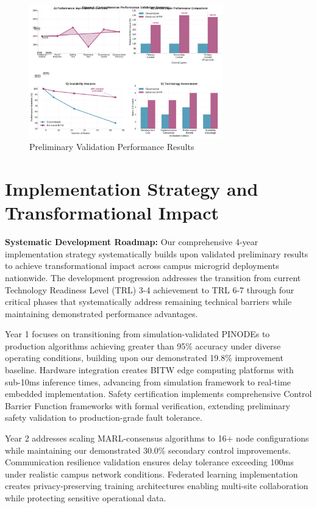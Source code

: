 \documentclass[12pt]{article}
\begin{document}
\begin{figure}[H]
\centering
\includegraphics[width=0.75\textwidth]{figure4_performance_summary.pdf}
\caption{Preliminary Validation Performance Results}
\end{figure}

\section{Implementation Strategy and Transformational Impact}

\textbf{Systematic Development Roadmap:} Our comprehensive 4-year implementation strategy systematically builds upon validated preliminary results to achieve transformational impact across campus microgrid deployments nationwide. The development progression addresses the transition from current Technology Readiness Level (TRL) 3-4 achievement to TRL 6-7 through four critical phases that systematically address remaining technical barriers while maintaining demonstrated performance advantages.

Year 1 focuses on transitioning from simulation-validated PINODEs to production algorithms achieving greater than 95\% accuracy under diverse operating conditions, building upon our demonstrated 19.8\% improvement baseline. Hardware integration creates BITW edge computing platforms with sub-10ms inference times, advancing from simulation framework to real-time embedded implementation. Safety certification implements comprehensive Control Barrier Function frameworks with formal verification, extending preliminary safety validation to production-grade fault tolerance.

Year 2 addresses scaling MARL-consensus algorithms to 16+ node configurations while maintaining our demonstrated 30.0\% secondary control improvements. Communication resilience validation ensures delay tolerance exceeding 100ms under realistic campus network conditions. Federated learning implementation creates privacy-preserving training architectures enabling multi-site collaboration while protecting sensitive operational data.
\end{document}
